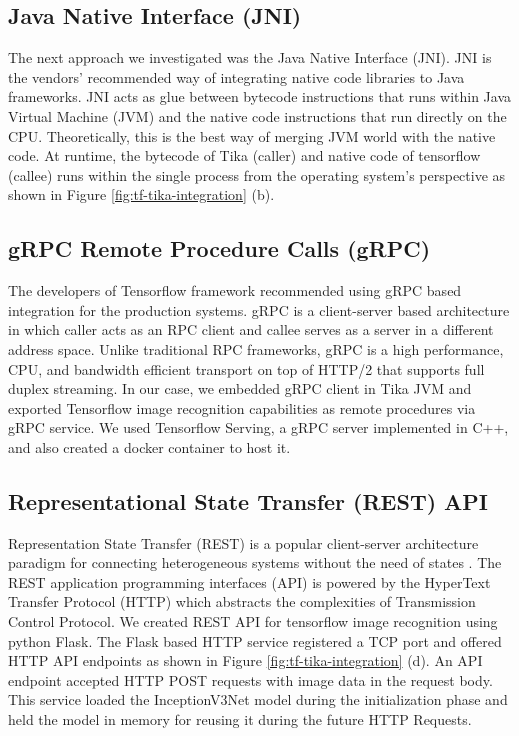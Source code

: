 \subsection{Java Native Interface (JNI)} \label{sec:int-jni}
The next approach we investigated was the Java Native Interface (JNI). JNI is the vendors' recommended way of integrating native code libraries to Java frameworks\cite{}. JNI acts as glue between bytecode instructions that runs within Java Virtual Machine (JVM) and the native code instructions that run directly on the CPU. Theoretically, this is the best way of merging JVM world with the native code\cite{}. At runtime, the bytecode of Tika (caller) and native code of tensorflow (callee) runs within the single process from the operating system's perspective as shown in Figure \ref{fig:tf-tika-integration} (b).


\subsection{gRPC Remote Procedure Calls (gRPC)} \label{sec:int-rpc}
The developers of Tensorflow framework recommended using gRPC based integration for the production systems\cite{goog-tfserve}. gRPC is a client-server based architecture in which caller acts as an RPC client and callee serves as a server in a different address space. Unlike traditional RPC frameworks, gRPC is a high performance, CPU, and bandwidth efficient transport on top of HTTP/2 that supports full duplex streaming\cite{about-grpc}. In our case, we embedded gRPC client in Tika JVM and exported Tensorflow image recognition capabilities as remote procedures via gRPC service. We used Tensorflow Serving, a gRPC server implemented in C++, and also created a docker container to host it.


\subsection{Representational State Transfer (REST) API} \label{sec:int-rest}
Representation State Transfer (REST) is a popular client-server architecture paradigm for connecting heterogeneous systems without the need of states \cite[Chapter~5]{Fielding:2000:ASD:932295}. The REST application programming interfaces (API) is powered by the HyperText Transfer Protocol (HTTP) which abstracts the complexities of Transmission Control Protocol.
We created REST API for tensorflow image recognition using python Flask. The Flask based HTTP service registered a TCP port and offered HTTP API endpoints as shown in Figure \ref{fig:tf-tika-integration} (d).
An API endpoint accepted HTTP POST requests with image data in the request body. This service loaded the InceptionV3Net \cite{SzegedyVISW15} model during the initialization phase and held the model in memory for reusing it during the future HTTP Requests.

